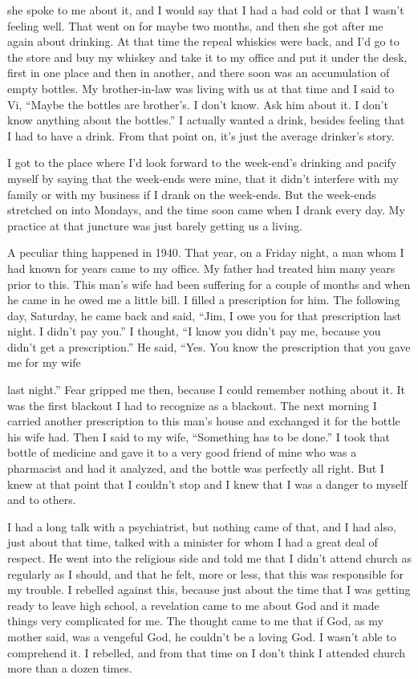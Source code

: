 \begin{biblechapter}
she spoke to me about it, and I would say that I had a bad cold or that I wasn’t feeling well. That went on for maybe two months, and then she got after me again about drinking. At that time the repeal whiskies were back, and I’d go to the store and buy my whiskey and take it to my office and put it under the desk, first in one place and then in another, and there soon was an accumulation of empty bottles. My brother-in-law was living with us at that time and I said to Vi, “Maybe the bottles are brother’s. I don’t know. Ask him about it. I don’t know anything about the bottles.” I actually wanted a drink, besides feeling that I had to have a drink. From that point on, it’s just the average drinker’s story.

I got to the place where I’d look forward to the week-end’s drinking and pacify myself by saying that the week-ends were mine, that it didn’t interfere with my family or with my business if I drank on the week-ends. But the week-ends stretched on into Mondays, and the time soon came when I drank every day. My practice at that juncture was just barely getting us a living.

A peculiar thing happened in 1940. That year, on a Friday night, a man whom I had known for years came to my office. My father had treated him many years prior to this. This man’s wife had been suffering for a couple of months and when he came in he owed me a little bill. I filled a prescription for him. The following day, Saturday, he came back and said, “Jim, I owe you for that prescription last night. I didn’t pay you.” I thought, “I know you didn’t pay me, because you didn’t get a prescription.” He said, “Yes. You know the prescription that you gave me for my wife

last night.” Fear gripped me then, because I could remember nothing about it. It was the first blackout I had to recognize as a blackout. The next morning I carried another prescription to this man’s house and exchanged it for the bottle his wife had. Then I said to my wife, “Something has to be done.” I took that bottle of medicine and gave it to a very good friend of mine who was a pharmacist and had it analyzed, and the bottle was perfectly all right. But I knew at that point that I couldn’t stop and I knew that I was a danger to myself and to others.

I had a long talk with a psychiatrist, but nothing came of that, and I had also, just about that time, talked with a minister for whom I had a great deal of respect. He went into the religious side and told me that I didn’t attend church as regularly as I should, and that he felt, more or less, that this was responsible for my trouble. I rebelled against this, because just about the time that I was getting ready to leave high school, a revelation came to me about God and it made things very complicated for me. The thought came to me that if God, as my mother said, was a vengeful God, he couldn’t be a loving God. I wasn’t able to comprehend it. I rebelled, and from that time on I don’t think I attended church more than a dozen times.


\end{biblechapter}
